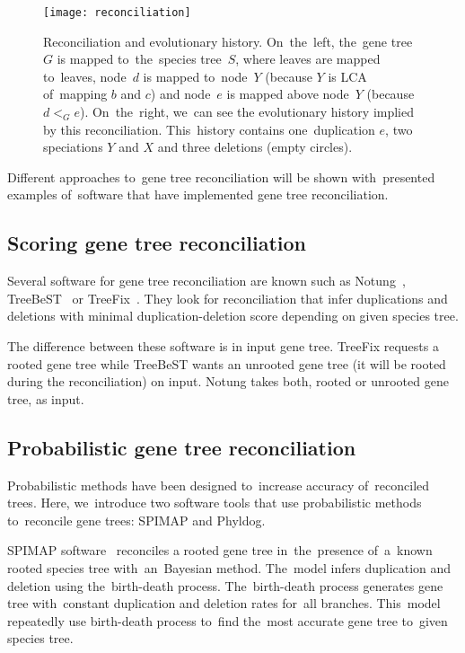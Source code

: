 \begin{figure}[h]
	\centering
	\label{reconciliation}
  	\texttt{[image: reconciliation]}
  	\caption{Reconciliation and evolutionary history. On~the~left, the~gene tree~$G$ is mapped to~the~species tree~$S$, where leaves are mapped to~leaves, node~$d$ is mapped to~node~$Y$ (because $Y$ is LCA of~mapping $b$ and $c$) and node~$e$ is mapped above node~$Y$ (because $d<_Ge$). On~the~right, we~can see the evolutionary history implied by this reconciliation. This~history contains one~duplication $e$, two speciations $Y$ and $X$ and three deletions (empty circles).}
\end{figure}

Different approaches to~gene tree reconciliation will be shown with~presented examples of~software that have implemented gene tree reconciliation. 


\subsection{Scoring gene tree reconciliation}
Several software for gene tree reconciliation are known such as 
Notung~\cite{notung}, TreeBeST~\cite{treebest} or TreeFix~\cite{treefix}. They look for reconciliation that infer duplications and deletions with minimal duplication-deletion score depending on given species tree.

The difference between these software is in input gene tree. TreeFix requests a rooted gene tree while TreeBeST wants an unrooted gene tree (it will be rooted during the reconciliation) on input. Notung takes both, rooted or unrooted gene tree, as input.

\subsection{Probabilistic gene tree reconciliation}
Probabilistic methods have been designed to~increase accuracy of~reconciled trees. Here, we~introduce two software tools that use probabilistic methods to~reconcile gene trees: SPIMAP and Phyldog.

SPIMAP software~\cite{spimap} reconciles a rooted gene tree in~the~presence of~a~known rooted species tree with~an~Bayesian method. The~model infers duplication and deletion using the~birth-death process. The~birth-death process generates gene tree with~constant duplication and deletion rates for~all branches. This~model repeatedly use birth-death process to~find the~most accurate gene tree to~given species tree.

